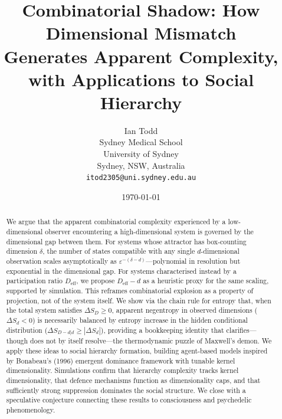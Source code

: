 \documentclass[12pt,a4paper]{article}
\title{\textbf{Combinatorial Shadow: How Dimensional Mismatch\\Generates Apparent Complexity,\\with Applications to Social Hierarchy}}
\author{Ian Todd\\
Sydney Medical School\\
University of Sydney\\
Sydney, NSW, Australia\\
\texttt{itod2305@uni.sydney.edu.au}}
\date{\today}
\begin{document}
\maketitle

\begin{abstract}
We argue that the apparent combinatorial complexity experienced by a low-dimensional observer encountering a high-dimensional system is governed by the dimensional gap between them.
For systems whose attractor has box-counting dimension $\delta$, the number of states compatible with any single $d$-dimensional observation scales asymptotically as $\varepsilon^{-(\delta - d)}$---polynomial in resolution but exponential in the dimensional gap.
For systems characterised instead by a participation ratio $D_{\mathrm{eff}}$, we propose $D_{\mathrm{eff}} - d$ as a heuristic proxy for the same scaling, supported by simulation.
This reframes combinatorial explosion as a property of projection, not of the system itself.
We show via the chain rule for entropy that, when the total system satisfies $\Delta S_D \geq 0$, apparent negentropy in observed dimensions ($\Delta S_d < 0$) is necessarily balanced by entropy increase in the hidden conditional distribution ($\Delta S_{D-d|d} \geq |\Delta S_d|$), providing a bookkeeping identity that clarifies---though does not by itself resolve---the thermodynamic puzzle of Maxwell's demon.
We apply these ideas to social hierarchy formation, building agent-based models inspired by Bonabeau's (1996) emergent dominance framework with tunable kernel dimensionality.
Simulations confirm that hierarchy complexity tracks kernel dimensionality, that defence mechanisms function as dimensionality caps, and that sufficiently strong suppression dominates the social structure.
We close with a speculative conjecture connecting these results to consciousness and psychedelic phenomenology.
\end{abstract}

\medskip
\noindent{}
\medskip

\end{document}
